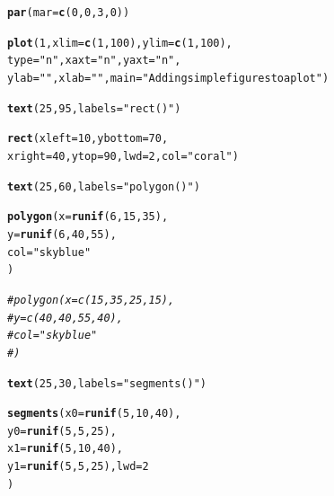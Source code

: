 \documentclass{tufte-book}\usepackage[]{graphicx}\usepackage[]{color}
\makeatletter
\newcommand{\hlnum}[1]{\textcolor[rgb]{0.686,0.059,0.569}{#1}}%
\newcommand{\hlstr}[1]{\textcolor[rgb]{0.192,0.494,0.8}{#1}}%
\newcommand{\hlcom}[1]{\textcolor[rgb]{0.678,0.584,0.686}{\textit{#1}}}%
\newcommand{\hlstd}[1]{\textcolor[rgb]{0.345,0.345,0.345}{#1}}%
\newcommand{\hlkwc}[1]{\textcolor[rgb]{0.333,0.667,0.333}{#1}}%
\newcommand{\hlkwd}[1]{\textcolor[rgb]{0.737,0.353,0.396}{\textbf{#1}}}%
\newenvironment{kframe}{%
 \def\at@end@of@kframe{}%
 \ifinner\ifhmode%
  \def\at@end@of@kframe{\end{minipage}}%
  \begin{minipage}{\columnwidth}%
 \fi\fi%
 \def\FrameCommand##1{\hskip\@totalleftmargin \hskip-\fboxsep
 \colorbox{shadecolor}{##1}\hskip-\fboxsep
     \hskip-\linewidth \hskip-\@totalleftmargin \hskip\columnwidth}%
 \MakeFramed {\advance\hsize-\width
   \@totalleftmargin\z@ \linewidth\hsize
   \@setminipage}}%
 {\par\unskip\endMakeFramed%
 \at@end@of@kframe}
\newenvironment{knitrout}{}{} %
\makeatother
\begin{document}
\begin{marginfigure}
\begin{tiny}
\begin{knitrout}
\color{fgcolor}\begin{kframe}
\begin{alltt}
\hlkwd{par}\hlstd{(}\hlkwc{mar} \hlstd{=} \hlkwd{c}\hlstd{(}\hlnum{0}\hlstd{,} \hlnum{0}\hlstd{,} \hlnum{3}\hlstd{,} \hlnum{0}\hlstd{))}

\hlkwd{plot}\hlstd{(}\hlnum{1}\hlstd{,} \hlkwc{xlim} \hlstd{=} \hlkwd{c}\hlstd{(}\hlnum{1}\hlstd{,} \hlnum{100}\hlstd{),} \hlkwc{ylim} \hlstd{=} \hlkwd{c}\hlstd{(}\hlnum{1}\hlstd{,} \hlnum{100}\hlstd{),}
     \hlkwc{type} \hlstd{=} \hlstr{"n"}\hlstd{,} \hlkwc{xaxt} \hlstd{=} \hlstr{"n"}\hlstd{,} \hlkwc{yaxt} \hlstd{=} \hlstr{"n"}\hlstd{,}
     \hlkwc{ylab} \hlstd{=} \hlstr{""}\hlstd{,} \hlkwc{xlab} \hlstd{=} \hlstr{""}\hlstd{,} \hlkwc{main} \hlstd{=} \hlstr{"Adding simple figures to a plot"}\hlstd{)}

\hlkwd{text}\hlstd{(}\hlnum{25}\hlstd{,} \hlnum{95}\hlstd{,} \hlkwc{labels} \hlstd{=} \hlstr{"rect()"}\hlstd{)}

\hlkwd{rect}\hlstd{(}\hlkwc{xleft} \hlstd{=} \hlnum{10}\hlstd{,} \hlkwc{ybottom} \hlstd{=} \hlnum{70}\hlstd{,}
     \hlkwc{xright} \hlstd{=} \hlnum{40}\hlstd{,} \hlkwc{ytop} \hlstd{=} \hlnum{90}\hlstd{,} \hlkwc{lwd} \hlstd{=} \hlnum{2}\hlstd{,} \hlkwc{col} \hlstd{=} \hlstr{"coral"}\hlstd{)}

\hlkwd{text}\hlstd{(}\hlnum{25}\hlstd{,} \hlnum{60}\hlstd{,} \hlkwc{labels} \hlstd{=} \hlstr{"polygon()"}\hlstd{)}

\hlkwd{polygon}\hlstd{(}\hlkwc{x} \hlstd{=} \hlkwd{runif}\hlstd{(}\hlnum{6}\hlstd{,} \hlnum{15}\hlstd{,} \hlnum{35}\hlstd{),}
        \hlkwc{y} \hlstd{=} \hlkwd{runif}\hlstd{(}\hlnum{6}\hlstd{,} \hlnum{40}\hlstd{,} \hlnum{55}\hlstd{),}
        \hlkwc{col} \hlstd{=} \hlstr{"skyblue"}
        \hlstd{)}


\hlcom{# polygon(x = c(15, 35, 25, 15),}
\hlcom{#         y = c(40, 40, 55, 40),}
\hlcom{#         col = "skyblue"}
\hlcom{#         )}

\hlkwd{text}\hlstd{(}\hlnum{25}\hlstd{,} \hlnum{30}\hlstd{,} \hlkwc{labels} \hlstd{=} \hlstr{"segments()"}\hlstd{)}

\hlkwd{segments}\hlstd{(}\hlkwc{x0} \hlstd{=} \hlkwd{runif}\hlstd{(}\hlnum{5}\hlstd{,} \hlnum{10}\hlstd{,} \hlnum{40}\hlstd{),}
         \hlkwc{y0} \hlstd{=} \hlkwd{runif}\hlstd{(}\hlnum{5}\hlstd{,} \hlnum{5}\hlstd{,} \hlnum{25}\hlstd{),}
         \hlkwc{x1} \hlstd{=} \hlkwd{runif}\hlstd{(}\hlnum{5}\hlstd{,} \hlnum{10}\hlstd{,} \hlnum{40}\hlstd{),}
         \hlkwc{y1} \hlstd{=} \hlkwd{runif}\hlstd{(}\hlnum{5}\hlstd{,} \hlnum{5}\hlstd{,} \hlnum{25}\hlstd{),} \hlkwc{lwd} \hlstd{=} \hlnum{2}
         \hlstd{)}


\end{alltt}
\end{kframe}
\end{knitrout}
\end{tiny}
\end{marginfigure}
\end{document}
